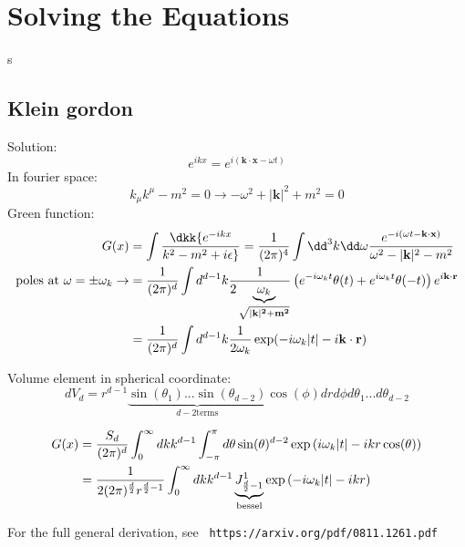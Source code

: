 \documentclass[10pt]{scrartcl}
\begin{document}
\section{Solving the Equations}
s\subsection{Klein gordon}
Solution:
\[e^{ikx} = e^{i (\mathbf{k} \cdot \mathbf{x} - \omega t)} \]
In fourier space:
\[k_\mu k^\mu - m^2 = 0 \rightarrow -\omega^2 + |\mathbf{k}|^2 + m^2 = 0 \]
Green function:
\begin{align}
G(x) &= \int \dkk {e^{-ikx} \over k^2 - m^2 + i \epsilon}  = {1 \over (2 \pi)^4} \int \dd^3 k \dd \omega { e^{-i (\omega t - \mathbf{k} \cdot \mathbf{x}) }  \over \omega^2 - |\mathbf{k}|^2 - m^2} \\
 \text{poles at $\omega =\pm \omega_k$}
\rightarrow  & = {1 \over (2 \pi)^{d}} \int d^{d-1} k {1 \over 2 \underbrace{\omega_k}_{\sqrt{|\bf{k}|^2 + m^2}}} \left(e^{- i \omega_k t} \theta(t) + e^{i \omega_k t} \theta(-t) \right) e^{i \bf{k} \cdot r} \\
& = {1 \over (2 \pi)^d} \int d^{d-1} k {1 \over 2 \omega_k} \exp(-i \omega_k |t| - i \bf{k} \cdot \bf{r})
\end{align}

Volume element in spherical coordinate:
$$ dV_d = r^{d-1} \underbrace{\sin(\theta_1)... \sin(\theta_{d-2})}_{d-2 \text{terms}} \cos(\phi) dr d\phi d\theta_1 ... d \theta_{d-2}$$

\begin{align}
	G(x) &= {S_d \over (2 \pi)^d} \int_0^\infty  dk k^{d-1}  \int_{-\pi}^{\pi}  d \theta \sin(\theta)^{d-2} \exp \left(i \omega_k |t| - i k r \cos(\theta) \right) \\
	& = {1 \over 2 (2 \pi )^{d \over 2} r^{{d \over 2} -1} } \int_0^{\infty} dk k^{d-1} \underbrace{J^1_{{d \over 2}-1}}_{\text{bessel}} \exp \left(-i \omega_k |t| - i kr \right)
	\end{align}


For the full general derivation, see \texttt{ https://arxiv.org/pdf/0811.1261.pdf }
\end{document}
